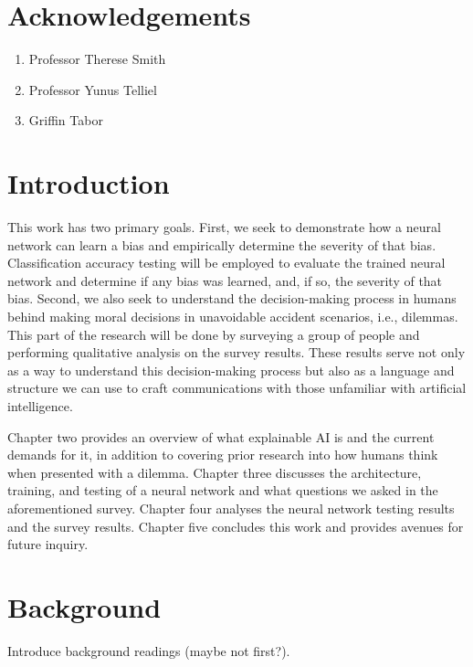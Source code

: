 \documentclass[]{report}
\begin{document}
\chapter*{Acknowledgements}

\begin{enumerate}
    \item Professor Therese Smith
    \item Professor Yunus Telliel
    \item Griffin Tabor
\end{enumerate}

\tableofcontents

\FloatBarrier
\chapter{Introduction}

This work has two primary goals. First, we seek to demonstrate how a neural network can learn a bias
and empirically determine the severity of that bias. Classification accuracy testing will be
employed to evaluate the trained neural network and determine if any bias was learned, and, if so,
the severity of that bias. Second, we also seek to understand the decision-making process in humans
behind making moral decisions in unavoidable accident scenarios, i.e., dilemmas. This part of the
research will be done by surveying a group of people and performing qualitative analysis on the
survey results. These results serve not only as a way to understand this decision-making process but
also as a language and structure we can use to craft communications with those unfamiliar with
artificial intelligence.

Chapter two provides an overview of what explainable AI is and the current demands for it, in
addition to covering prior research into how humans think when presented with a dilemma. Chapter
three discusses the architecture, training, and testing of a neural network and what questions we
asked in the aforementioned survey. Chapter four analyses the neural network testing results and the
survey results. Chapter five concludes this work and provides avenues for future inquiry.


\FloatBarrier
\chapter{Background}

Introduce background readings (maybe not first?).
\end{document}
